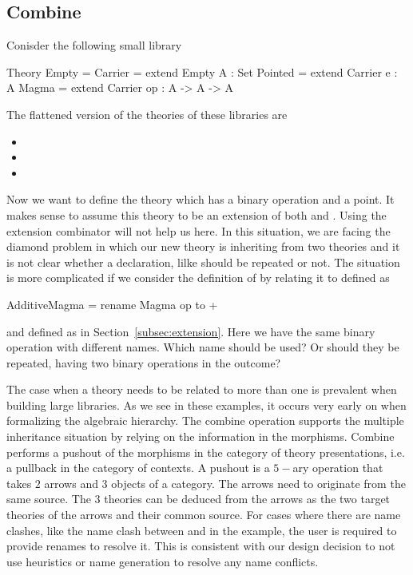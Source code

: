 \subsection{Combine}
\label{subsec:combine}
Conisder the following small library
\begin{togcode} 
Theory Empty = {} 
Carrier = extend Empty {A : Set}
Pointed = extend Carrier {e : A}
Magma   = extend Carrier {op : A -> A -> A}
\end{togcode} 
The flattened version of the theories of these libraries are 
\begin{itemize}
\item[] 
\item[]  
\item[]  
\end{itemize}
Now we want to define the theory  which has a binary operation and a point. It makes sense to assume this theory to be an extension of both  and . Using the extension combinator will not help us here. In this situation, we are facing the diamond problem in which our new theory is inheriting from two theories and it is not clear whether a declaration, lilke  should be repeated or not. 
The situation is more complicated if we consider the definition of  by relating it to  defined as 
\begin{togcode} 
AdditiveMagma = rename Magma {op to +} 
\end{togcode} 
and  defined as in Section~\ref{subsec:extension}. Here we have the same binary operation with different names. Which name should be used? Or should they be repeated, having two  binary operations in the outcome? 

The case when a theory needs to be related to more than one is prevalent when building large libraries. As we see in these examples, it occurs very early on when formalizing the algebraic hierarchy. The combine operation supports the multiple inheritance situation by relying on the information in the morphisms. Combine performs a pushout of the morphisms in the category of theory presentations, i.e. a pullback in the category of contexts.  A pushout is a $5-$ary operation that takes $2$ arrows and $3$ objects of a category. The arrows need to originate from the same source. The $3$ theories can be deduced from the arrows as the two target theories of the arrows and their common source. For cases where there are name clashes, like the name clash between  and \lstmath{+} in the  example, the user is required to provide renames to resolve it. This is consistent with our design decision to not use heuristics or name generation to resolve any name conflicts. 

